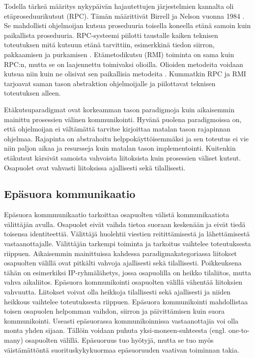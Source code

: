 Todella tärkeä määritys nykypäivän hajautettujen järjestelmien kannalta oli etäproseduurikutsut (RPC). Tämän määrittivät Birrell ja Nelson vuonna 1984 \cite{implemeting-remote-procedure-calls}. Se mahdollisti ohjelmoijan kutsua proseduuria toisella koneella etänä samoin kuin paikallista proseduuria. RPC-systeemi piilotti taustalle kaiken teknisen toteutuksen mitä kutsuun etänä tarvittiin, esimerkkinä tiedon siirron, pakkaamisen ja purkamisen \cite[s.~195--196]{distributed-systems-concepts-and-design}. Etämetodikutsu (RMI) toiminta on sama kuin RPC:n, mutta se on laajennettu toimivaksi olioilla. Olioiden metodeita voidaan kutsua niin kuin ne olisivat sen paikallisia metodeita \cite[s.~204]{distributed-systems-concepts-and-design}. Kummatkin RPC ja RMI tarjoavat saman tason abstraktion ohjelmoijalle ja piilottavat teknisen toteutuksen alleen.

Etäkutsuparadigmat ovat korkeamman tason paradigmoja kuin aikaisemmin mainittu prosessien välinen kommunikointi. Hyvänä puolena paradigmoissa on, että ohjelmoijan ei vältämättä tarvitse kirjoittaa matalan tason rajapinnan ohjelmaa. Rajapinta on abstrahoitu helppokäyttöisemmäksi ja sen toteutus ei vie niin paljon aikaa ja resursseja kuin matalan tason implementointi. Kuitenkin etäkutsut kärsivät samoista vahvoista liitoksista kuin prosessien väliset kutsut. Osapuolet ovat vahvasti liitoksissa ajallisesti sekä tilallisesti.


\subsection{Epäsuora kommunikaatio}
\label{ch:indirect-communication}
Epäsuora kommmunikaatio tarkoittaa osapuolten välistä kommunikaatiota välittäjän avulla. Osapuolet eivät vaihda tietoa suoraan keskenään ja eivät tiedä toisensa identiteettiä. Välittäjä huolehtii viestien reitittämisestä ja lähettämisestä vastaanottajalle. Välittäjän tarkempi toiminta ja tarkoitus vaihtelee toteutuksesta riippuen. Aikaisemmin mainittuissa kahdessa paradigmakategoriassa liitokset osapuolten välillä ovat pitkälti vahvoja ajallisesti sekä tilallisesti. Poikkeuksena tähän on esimerkiksi IP-ryhmälähetys, jossa osapuolilla on heikko tilaliitos, mutta vahva aikaliitos. Epäsuora kommunikointi osapuolten välillä vähentää liitoksien vahvuutta. Liitokset voivat olla heikkoja tilallisesti sekä ajallisesti ja niiden heikkous vaihtelee toteutuksesta riippuen. Epäsuora kommunikointi mahdollistaa toisen osapuolen helpomman vaihdon, siirron ja päivittämisen kuin suora kommunikointi. Useasti epäsuorassa kommunikoinnissa vastaanottajia voi olla monta yhden sijaan. Tällöin voidaan puhuta yksi-moneen-suhteesta (engl. one-to-many) osapuolten välillä. Epäsuoruus tuo hyötyjä, mutta se tuo myös väistämättöntä suorituskykykuormaa epäsuoruuden vaativan toiminnan takia. \mbox{\cite[s.~230--231]{distributed-systems-concepts-and-design}}

